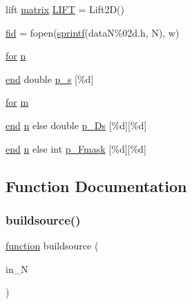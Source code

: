 \begin{DoxyCompactItemize}
lift \hyperlink{a01014_af07ff1035f34d77764ff516f110e6832}{matrix} \hyperlink{a00575_a14c594ef4287da2ed00e98012e0356d9}{L\+I\+FT} = Lift2D()
\item 
\hyperlink{a00575_ae9011d40c6f13e68e6f07156e0da7c5d}{fid} = fopen(\hyperlink{a00575_ae6aab5c308faac0fc539cc9c6da9fbd0}{sprintf}(\textquotesingle{}dataN\%02d.\+h\textquotesingle{}, N), \textquotesingle{}w\textquotesingle{})
\item 
\hyperlink{a00623_ad1e7380d51df1e0043d24d3c8a860e0a}{for} \hyperlink{a00575_a4c2d80ab32fc3a598413ae25e9f2bdce}{n}
\item 
\hyperlink{a00608_afb358f48b1646c750fb9da6c6585be2b}{end} double \hyperlink{a00575_a4d86e706676adc9b0dd7eb7119977cc9}{p\+\_\+s} \mbox{[}\%d\mbox{]}
\item 
\hyperlink{a00623_ad1e7380d51df1e0043d24d3c8a860e0a}{for} \hyperlink{a00575_ab780b65adc28bca17f186bf3eebfb21d}{m}
\item 
\hyperlink{a00608_afb358f48b1646c750fb9da6c6585be2b}{end} \hyperlink{a00623_a781a04ab095280f838ff3eb0e51312e0}{n} else double \hyperlink{a00575_acedf935d501d314e9d0c0d676fa4d667}{p\+\_\+\+Ds} \mbox{[}\%d\mbox{]}\mbox{[}\%d\mbox{]}
\item 
\hyperlink{a00608_afb358f48b1646c750fb9da6c6585be2b}{end} \hyperlink{a00623_a781a04ab095280f838ff3eb0e51312e0}{n} else int \hyperlink{a00575_a0fc21bbbb980444a6aca246b7ba443d9}{p\+\_\+\+Fmask} \mbox{[}\%d\mbox{]}\mbox{[}\%d\mbox{]}
\end{DoxyCompactItemize}


\subsection{Function Documentation}
\mbox{\label{a00575_a39d26c9ec5258e8eb8c2fa79f9d0f5d2}} 
\subsubsection{\texorpdfstring{buildsource()}{buildsource()}}
{\footnotesize\ttfamily \hyperlink{a00611_a2420833d971716e9bab41cc9fb3abba1}{function} buildsource (\begin{DoxyParamCaption}\item[{in\+\_\+N}]{ }\end{DoxyParamCaption})}

\mbox{\label{a00575_a53fedbe0b7d30bbdae17dd4984fb3177}} 
